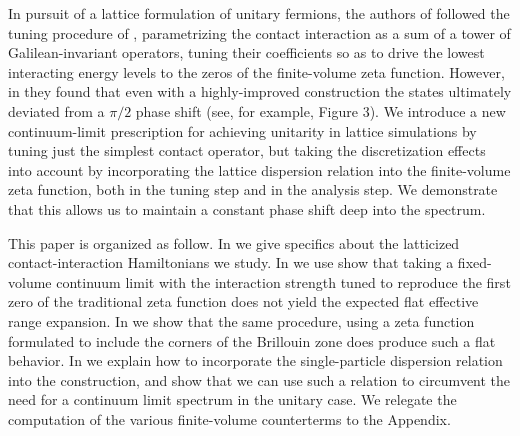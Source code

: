 In pursuit of a lattice formulation of unitary fermions, the authors of  followed the tuning procedure of , parametrizing the contact interaction as a sum of a tower of Galilean-invariant operators, tuning their coefficients so as to drive the lowest interacting energy levels to the zeros of the \Luscher finite-volume zeta function.
However, in  they found that even with a highly-improved construction the states ultimately deviated from a $\pi/2$ phase shift (see, for example, Figure 3).
We introduce a new continuum-limit prescription for achieving unitarity in lattice simulations by tuning just the simplest contact operator, but taking the discretization effects into account by incorporating the lattice dispersion relation into the finite-volume zeta function, both in the tuning step and in the analysis step.
We demonstrate that this allows us to maintain a constant phase shift deep into the spectrum.


This paper is organized as follow.  In  we give specifics about the latticized contact-interaction Hamiltonians we study.  In  we use show that taking a fixed-volume continuum limit with the interaction strength tuned to reproduce the first zero of the traditional zeta function does not yield the expected flat effective range expansion.  In  we show that the same procedure, using a zeta function formulated to include the corners of the Brillouin zone does produce such a flat behavior.
In  we explain how to incorporate the single-particle dispersion relation into the \Luscher construction, and show that we can use such a relation to circumvent the need for a continuum limit spectrum in the unitary case.
We relegate the computation of the various finite-volume counterterms to the Appendix.
